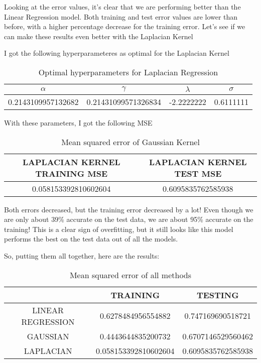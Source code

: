 \documentclass[11pt]{amsart}
\begin{document}
Looking at the error values, it's clear that we are performing better than the Linear Regression model. Both 
training and test error values are lower than before, with a higher percentage decrease for the training error. Let's see 
if we can make these results even better with the Laplacian Kernel 

I got the following hyperparameteres as optimal for the Laplacian Kernel 

\begin{table}[H]
    \centering
    \begin{tabular}{| c | c | c | c |}
         \hline
         $\alpha$ & $\gamma$ & $\lambda$ & $\sigma$ \\ \hline
         0.2143109957132682 & 0.21431099571326834 & -2.2222222 & 0.6111111\\ \hline
    \end{tabular}
    \caption{Optimal hyperparameters for Laplacian Regression}
    \label{tab:OptLap}
\end{table}

With these parameters, I got the following MSE 

\begin{table}[H]
    \centering
    \begin{tabular}{| c | c |}
         \hline
         LAPLACIAN KERNEL TRAINING MSE & LAPLACIAN KERNEL TEST MSE\\ \hline
         0.058153392810602604 & 0.6095835762585938 \\ \hline
    \end{tabular}
    \caption{Mean squared error of Gaussian Kernel}
    \label{tab:LaplacianKernelMSE}
\end{table}

Both errors decreased, but the training error decreased by a lot! Even though we are only about 39\% accurate 
on the test data, we are about 95\% accurate on the training! This is a clear sign of overfitting, but it still looks like 
this model performs the best on the test data out of all the models. 

So, putting them all together, here are the results: 

\begin{table}[H]
    \centering
    \begin{tabular}{| c | c | c |}
         \hline
         & TRAINING & TESTING\\ \hline
         LINEAR REGRESSION & 0.6278484956554882 & 0.747169690518721 \\ \hline
         GAUSSIAN & 0.4443644835200732 & 0.6707146529560462 \\ \hline
         LAPLACIAN & 0.058153392810602604 & 0.6095835762585938 \\ \hline
    \end{tabular}
    \caption{Mean squared error of all methods}
    \label{tab:All MSE}
\end{table}
\end{document}
